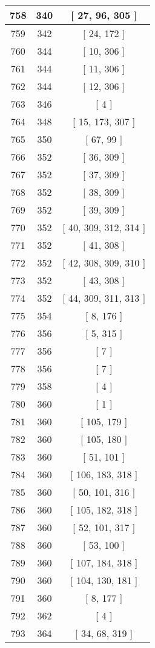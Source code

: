 \begin{center}
\begin{longtable}[H]{|| c c c ||}
758 & 340 & [ 27, 96, 305 ]
\\\hline
759 & 342 & [ 24, 172 ]
\\\hline
760 & 344 & [ 10, 306 ]
\\\hline
761 & 344 & [ 11, 306 ]
\\\hline
762 & 344 & [ 12, 306 ]
\\\hline
763 & 346 & [ 4 ]
\\\hline
764 & 348 & [ 15, 173, 307 ]
\\\hline
765 & 350 & [ 67, 99 ]
\\\hline
766 & 352 & [ 36, 309 ]
\\\hline
767 & 352 & [ 37, 309 ]
\\\hline
768 & 352 & [ 38, 309 ]
\\\hline
769 & 352 & [ 39, 309 ]
\\\hline
770 & 352 & [ 40, 309, 312, 314 ]
\\\hline
771 & 352 & [ 41, 308 ]
\\\hline
772 & 352 & [ 42, 308, 309, 310 ]
\\\hline
773 & 352 & [ 43, 308 ]
\\\hline
774 & 352 & [ 44, 309, 311, 313 ]
\\\hline
775 & 354 & [ 8, 176 ]
\\\hline
776 & 356 & [ 5, 315 ]
\\\hline
777 & 356 & [ 7 ]
\\\hline
778 & 356 & [ 7 ]
\\\hline
779 & 358 & [ 4 ]
\\\hline
780 & 360 & [ 1 ]
\\\hline
781 & 360 & [ 105, 179 ]
\\\hline
782 & 360 & [ 105, 180 ]
\\\hline
783 & 360 & [ 51, 101 ]
\\\hline
784 & 360 & [ 106, 183, 318 ]
\\\hline
785 & 360 & [ 50, 101, 316 ]
\\\hline
786 & 360 & [ 105, 182, 318 ]
\\\hline
787 & 360 & [ 52, 101, 317 ]
\\\hline
788 & 360 & [ 53, 100 ]
\\\hline
789 & 360 & [ 107, 184, 318 ]
\\\hline
790 & 360 & [ 104, 130, 181 ]
\\\hline
791 & 360 & [ 8, 177 ]
\\\hline
792 & 362 & [ 4 ]
\\\hline
793 & 364 & [ 34, 68, 319 ]

\end{longtable}
\end{center}
